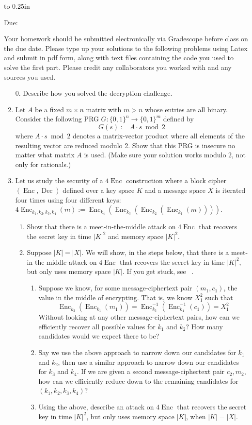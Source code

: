 \documentclass[letterpaper,12pt]{article}
\newcommand{\htitle}
{
    \vbox to 0.25in{}
    \noindent\parbox{\textwidth}
    {
        \course\hfill \assigndate\newline
        \coursename\hfill 
        Due: \duedate \vspace*{-.5ex}\newline
        \mbox{}\hrulefill\mbox{}
    }
    \vspace{8pt}
    \begin{center}{\Large\bf{\settitle}}\end{center}
}
\newcommand{\handout}
{
    \thispagestyle{empty}
    \markboth{}{}
    \pagestyle{plain}
    \htitle
}
\newcommand{\problemsetheader}
{
Your homework should be submitted electronically via Gradescope before class on the due date.  Please type up your solutions to the following problems using Latex and submit in pdf form, along with text files containing the code you used to solve the first part.  Please credit any collaborators you worked with and any sources you used.

\medskip

\hrulefill

\bigskip
}
\newcommand{\Enc}{\operatorname{Enc}}
\newcommand{\Dec}{\operatorname{Dec}}
\begin{document}
\handout
\setlength{\parindent}{0pt}
\problemsetheader

\begin{enumerate}

\item[0.] Describe how you solved the decryption challenge.

\item Let $A$ be a fixed $m \times n$ matrix with $m > n$ whose entries are all binary.  Consider the following PRG $G : \{0,1\}^n \rightarrow \{0,1\}^m$ defined by
  \[
  G(s) := A \cdot s \bmod 2
  \]
  where $A \cdot s \bmod 2$ denotes a matrix-vector product where all elements of the resulting vector are reduced modulo 2.  Show that this PRG is insecure no matter what matrix $A$ is used. (Make sure your solution works modulo 2, not only for rationals.)

\item Let us study the security of a $4\Enc$ construction where a block cipher $(\Enc, \Dec)$ defined over a key space $K$ and a message space $X$ is iterated four times using four different keys: $4\Enc_{k_1,k_2,k_3,k_4}(m) := \Enc_{k_4}(\Enc_{k_3}(\Enc_{k_2}(\Enc_{k_1}(m))))$.

  \begin{enumerate}
  \item Show that there is a meet-in-the-middle attack on $4\Enc$ that recovers the secret key in time $|K|^2$ and memory space $|K|^2$.
    
  \item Suppose $|K| = |X|$. We will show, in the steps below, that there is a meet-in-the-middle attack on $4\Enc$ that recovers the secret key in time $|K|^2$, but only uses memory space $|K|$. If you get stuck, see ~\cite{doks12}.
      \begin{enumerate}
      \item Suppose we know, for some message-ciphertext pair $(m_1, c_1)$, the value in the middle of encrypting. That is, we know $X_1^2$ such that $$\Enc_{k_2}(\Enc_{k_1}(m_1)) = \Enc_{k_3}^{-1}(\Enc_{k_4}^{-1}(c_1)) = X_1^2$$
      Without looking at any other message-ciphertext pairs, how can we efficiently recover all possible values for $k_1$ and $k_2$? How many candidates would we expect there to be? 
      \item Say we use the above approach to narrow down our candidates for $k_1$ and $k_2$, then use a similar approach to narrow down our candidates for $k_3$ and $k_4$. If we are given a second message-ciphertext pair $c_2, m_2$, how can we efficiently reduce down to the remaining candidates for $(k_1, k_2, k_3, k_4)$?
      \item Using the above, describe an attack on $4\Enc$ that recovers the secret key in time $|K|^2$, but only uses memory space $|K|$, when $|K| = |X|$. 
      \end{enumerate}
  \end{enumerate}
\end{enumerate}
\vfill
\end{document}
